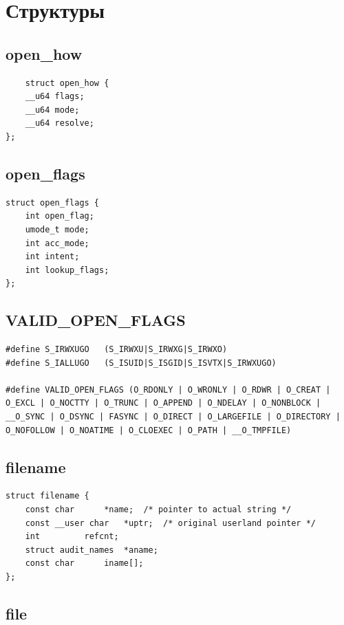 \chapter{Структуры}

\section{open\_how}

\begin{lstlisting}
	struct open_how {
	__u64 flags;
	__u64 mode;
	__u64 resolve; 
};
\end{lstlisting}

\section{open\_flags}

\begin{lstlisting}
struct open_flags {
	int open_flag;
	umode_t mode;
	int acc_mode;
	int intent;
	int lookup_flags;
};
\end{lstlisting}

\section{VALID\_OPEN\_FLAGS}

\begin{lstlisting}
#define S_IRWXUGO	(S_IRWXU|S_IRWXG|S_IRWXO)
#define S_IALLUGO	(S_ISUID|S_ISGID|S_ISVTX|S_IRWXUGO)

#define VALID_OPEN_FLAGS (O_RDONLY | O_WRONLY | O_RDWR | O_CREAT | O_EXCL | O_NOCTTY | O_TRUNC | O_APPEND | O_NDELAY | O_NONBLOCK | __O_SYNC | O_DSYNC | FASYNC	| O_DIRECT | O_LARGEFILE | O_DIRECTORY | O_NOFOLLOW | O_NOATIME | O_CLOEXEC | O_PATH | __O_TMPFILE)
\end{lstlisting}

\section{filename}

\begin{lstlisting}
struct filename {
	const char		*name;	/* pointer to actual string */
	const __user char	*uptr;	/* original userland pointer */
	int			refcnt;
	struct audit_names	*aname;
	const char		iname[];
};
\end{lstlisting}

\section{file}

